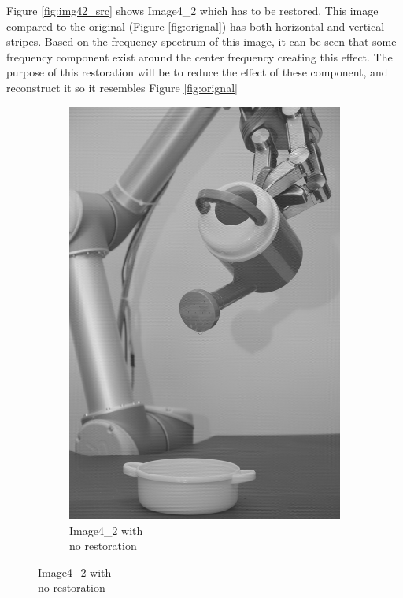 Figure \ref{fig:img42_src} shows  Image4\_2 which has to be restored. This image  compared to the original  (Figure \ref{fig:orignal}) has  both horizontal and vertical stripes.   Based on the frequency spectrum of this image, it can be seen that some frequency component exist around the center frequency creating this effect. The purpose of this restoration will be to reduce the effect of these component, and reconstruct it so it resembles Figure \ref{fig:orignal}

\begin{figure}[H]
    \centering
    \begin{subfigure}[b]{0.3\textwidth}
        \includegraphics[width=\textwidth]{img4/Image4_2.png}
        \caption{Image4\_2 with \\no restoration}

\end{subfigure}
\end{figure}
